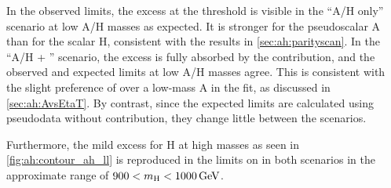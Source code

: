 In the observed limits, the excess at the \ttbar threshold is visible in the ``A/H only'' scenario at low A/H masses as expected. It is stronger for the pseudoscalar A than for the scalar H, consistent with the results in \cref{sec:ah:parityscan}. 
In the ``A/H + \etat'' scenario, the excess is fully absorbed by the \etat contribution, and the observed and expected limits at low A/H masses agree. This is consistent with the slight preference of \etat over a low-mass A in the fit, as discussed in \cref{sec:ah:AvsEtaT}.
By contrast, since the expected limits are calculated using pseudodata without \etat contribution, they change little between the scenarios.




Furthermore, the mild excess for H at high masses as seen in \cref{fig:ah:contour_ah_ll} is reproduced in the limits on \gHtt in both scenarios in the approximate range of $900 < \mH < \SI{1000}{\GeV}$.

